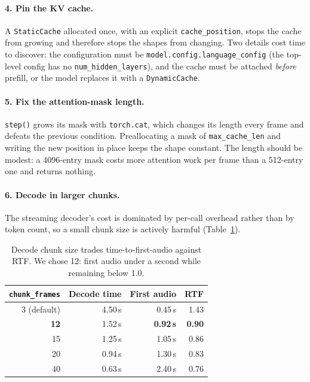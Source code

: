 \documentclass[11pt]{article}
\begin{document}
\paragraph{4. Pin the KV cache.} A \texttt{StaticCache} allocated once, with an explicit \texttt{cache\_position},
stops the cache from growing and therefore stops the shapes from changing. Two details cost time to discover: the
configuration must be \texttt{model.config.language\_config} (the top-level config has no
\texttt{num\_hidden\_layers}), and the cache must be attached \emph{before} prefill, or the model replaces it with a
\texttt{DynamicCache}.

\paragraph{5. Fix the attention-mask length.} \texttt{step()} grows its mask with \texttt{torch.cat}, which changes
its length every frame and defeats the previous condition. Preallocating a mask of \texttt{max\_cache\_len} and
writing the new position in place keeps the shape constant. The length should be modest: a 4096-entry mask costs
more attention work per frame than a 512-entry one and returns nothing.

\paragraph{6. Decode in larger chunks.} The streaming decoder's cost is dominated by per-call overhead rather than
by token count, so a small chunk size is actively harmful (Table~\ref{tab:chunk}).

\begin{table}[h]
\centering
\begin{tabular}{rrrr}
\toprule
\texttt{chunk\_frames} & Decode time & First audio & RTF \\
\midrule
3 (default) & 4.50\,s & 0.45\,s & 1.43 \\
\textbf{12} & 1.52\,s & \textbf{0.92\,s} & \textbf{0.90} \\
15 & 1.25\,s & 1.05\,s & 0.86 \\
20 & 0.94\,s & 1.30\,s & 0.83 \\
40 & 0.63\,s & 2.40\,s & 0.76 \\
\bottomrule
\end{tabular}
\caption{Decode chunk size trades time-to-first-audio against RTF. We chose 12: first audio under a second while
remaining below 1.0.}
\label{tab:chunk}
\end{table}
\end{document}
